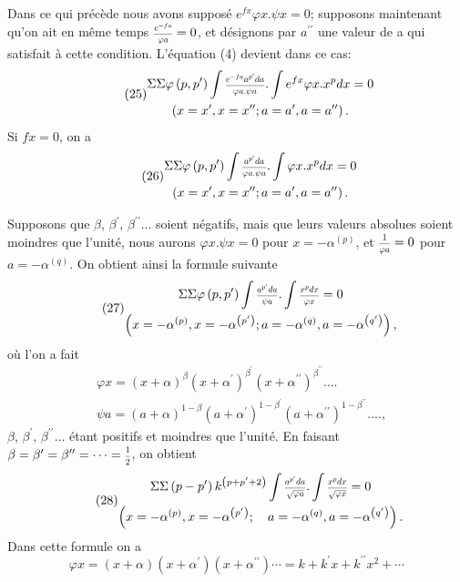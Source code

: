 \documentclass[oneside, 12 pt, leqno]{memoir}
\let\oldfrac\frac
\def\frac#1#2{\mathchoice{\text{\scalebox{.83}{${\oldfrac{#1}{#2}}$}}}{\text{\scalebox{.83}{${\displaystyle\oldfrac{#1}{#2}}$}}}{\genfrac{}{}{}{2}{#1}{#2}}{\genfrac{}{}{}{3}{#1}{#2}}}
\begin{document}
Dans ce qui précède nous avons supposé \(e^{f x} \varphi x. \psi x=0\); supposons maintenant qu'on ait en même temps \(\frac{e^{-f a}}{\varphi a}=0\), et désignons par \(a^{\prime \prime}\) une valeur de a qui satisfait à cette condition. L'équation (4) devient dans ce cas:
\[\tag{25}\begin{gathered}
\Sigma \Sigma \varphi\left(p, p^{\prime}\right) \int \frac{e^{-f a} a^{p^{\prime}} d a}{\varphi a. \psi a}. \int e^{f x} \varphi x. x^p d x=0 \\
\left(x=x^{\prime}, x=x^{\prime \prime} ;  a=a^{\prime}, a=a^{\prime \prime}\right).
\end{gathered}\]
Si \(f x=0\), on a
\[\tag{26}\begin{gathered}
\Sigma \Sigma \varphi\left(p, p^{\prime}\right) \int \frac{a^{p^{\prime}} d a}{\varphi a. \psi a}. \int \varphi x. x^p d x=0 \\
\left(x=x^{\prime}, x=x^{\prime \prime} ; a=a^{\prime}, a=a^{\prime \prime}\right).
\end{gathered}\]

Supposons que \(\beta\), \(\beta^{\prime}\), \(\beta^{\prime \prime} \ldots\) soient négatifs, mais que leurs valeurs absolues soient moindres que l'unité, nous aurons \(\varphi x. \psi x=0\) pour \(x=-\alpha^{(p)}\), et \(\frac{1}{\varphi a}=0\) pour \(a=-\alpha^{(q)}\). On obtient ainsi la formule suivante
\[\tag{27}\begin{gathered}
\Sigma \Sigma \varphi\left(p, p^{\prime}\right) \int \frac{a^{p^{\prime}} d a}{\psi a}. \int \frac{x^p d x}{\varphi x}=0 \\
\left(x=-\alpha^{(p)}, x=-\alpha^{\left(p^{\prime}\right)} ; a=-\alpha^{(q)}, a=-\alpha^{\left(q^{\prime}\right)}\right),
\end{gathered}\]
où l'on a fait
\[\begin{aligned}
& \varphi x=(x+\alpha)^\beta\left(x+\alpha^{\prime}\right)^{\beta^{\prime}}\left(x+\alpha^{\prime \prime}\right)^{\beta^{\prime \prime}} \ldots. \\
& \psi a=(a+\alpha)^{1-\beta} (a+\alpha^{\prime})^{1-\beta^{\prime}}(a+\alpha^{\prime \prime})^{1-\beta^{\prime \prime}} \ldots.,
\end{aligned}\]
\(\beta\), \(\beta^{\prime}\), \(\beta^{\prime \prime} \ldots\) étant positifs et moindres que l'unité.
En faisant \(\beta=\beta^{\prime}=\beta^{\prime \prime}=\cdots=\frac{1}{2}\), on obtient
\[\tag{28}
\begin{gathered}
\Sigma \Sigma\left(p-p^{\prime}\right) k^{\left(p+p^{\prime}+2\right)} \int \frac{a^{p^{\prime}} d a}{\sqrt{\varphi a}}. \int \frac{x^p d x}{\sqrt{\varphi x}}=0 \\
\left(x=-\alpha^{(p)}, x=-\alpha^{\left(p^{\prime}\right)} ; \quad a=-\alpha^{(q)}, a=-\alpha^{\left(q^{\prime}\right)}\right).
\end{gathered}\]
Dans cette formule on a
\[\varphi x=(x+\alpha)\left(x+\alpha^{\prime}\right)\left(x+\alpha^{\prime \prime}\right) \cdots=k+k^{\prime} x+k^{\prime \prime} x^2+\cdots\]
\end{document}
